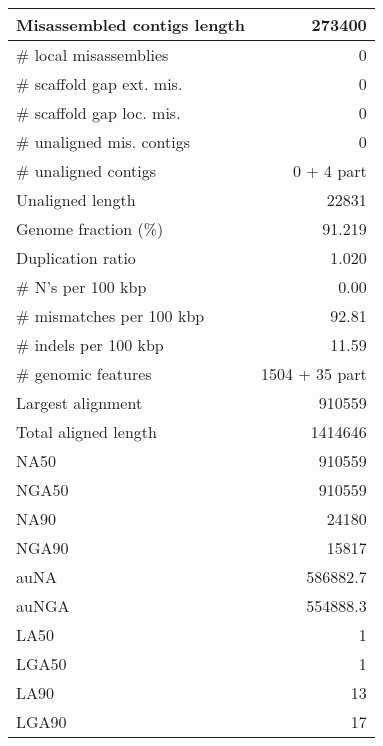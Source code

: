 \documentclass[12pt,a4paper]{article}
\begin{document}
\begin{table}[ht]
\begin{center}
\begin{tabular}{|l*{1}{|r}|}
Misassembled contigs length & 273400 \\ \hline
\# local misassemblies & 0 \\ \hline
\# scaffold gap ext. mis. & 0 \\ \hline
\# scaffold gap loc. mis. & 0 \\ \hline
\# unaligned mis. contigs & 0 \\ \hline
\# unaligned contigs & 0 + 4 part \\ \hline
Unaligned length & 22831 \\ \hline
Genome fraction (\%) & 91.219 \\ \hline
Duplication ratio & 1.020 \\ \hline
\# N's per 100 kbp & 0.00 \\ \hline
\# mismatches per 100 kbp & 92.81 \\ \hline
\# indels per 100 kbp & 11.59 \\ \hline
\# genomic features & 1504 + 35 part \\ \hline
Largest alignment & 910559 \\ \hline
Total aligned length & 1414646 \\ \hline
NA50 & 910559 \\ \hline
NGA50 & 910559 \\ \hline
NA90 & 24180 \\ \hline
NGA90 & 15817 \\ \hline
auNA & 586882.7 \\ \hline
auNGA & 554888.3 \\ \hline
LA50 & 1 \\ \hline
LGA50 & 1 \\ \hline
LA90 & 13 \\ \hline
LGA90 & 17 \\ \hline
\end{tabular}
\end{center}
\end{table}
\end{document}
